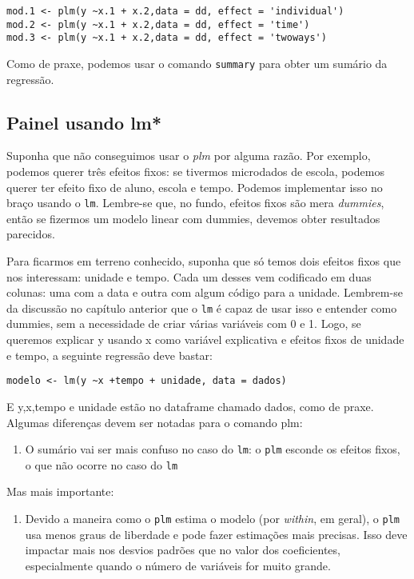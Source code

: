 \documentclass[
]{book}
\providecommand{\tightlist}{%
  \setlength{\itemsep}{0pt}\setlength{\parskip}{0pt}}
\begin{document}
\begin{verbatim}
mod.1 <- plm(y ~x.1 + x.2,data = dd, effect = 'individual')
mod.2 <- plm(y ~x.1 + x.2,data = dd, effect = 'time')
mod.3 <- plm(y ~x.1 + x.2,data = dd, effect = 'twoways')
\end{verbatim}

Como de praxe, podemos usar o comando \texttt{summary} para obter um sumário da regressão.

\hypertarget{painel-usando-lm}{%
\subsection{Painel usando lm*}\label{painel-usando-lm}}

Suponha que não conseguimos usar o \emph{plm} por alguma razão. Por exemplo, podemos querer três efeitos fixos: se tivermos microdados de escola, podemos querer ter efeito fixo de aluno, escola e tempo. Podemos implementar isso no braço usando o \texttt{lm}. Lembre-se que, no fundo, efeitos fixos são mera \emph{dummies}, então se fizermos um modelo linear com dummies, devemos obter resultados parecidos.

Para ficarmos em terreno conhecido, suponha que só temos dois efeitos fixos que nos interessam: unidade e tempo. Cada um desses vem codificado em duas colunas: uma com a data e outra com algum código para a unidade. Lembrem-se da discussão no capítulo anterior que o \texttt{lm} é capaz de usar isso e entender como dummies, sem a necessidade de criar várias variáveis com 0 e 1. Logo, se queremos explicar y usando x como variável explicativa e efeitos fixos de unidade e tempo, a seguinte regressão deve bastar:

\begin{verbatim}
modelo <- lm(y ~x +tempo + unidade, data = dados)
\end{verbatim}

E y,x,tempo e unidade estão no dataframe chamado dados, como de praxe. Algumas diferenças devem ser notadas para o comando plm:

\begin{enumerate}
\def\labelenumi{(\arabic{enumi})}
\tightlist
\item
  O sumário vai ser mais confuso no caso do \texttt{lm}: o \texttt{plm} esconde os efeitos fixos, o que não ocorre no caso do \texttt{lm}
\end{enumerate}

Mas mais importante:

\begin{enumerate}
\def\labelenumi{(\arabic{enumi})}
\setcounter{enumi}{1}
\tightlist
\item
  Devido a maneira como o \texttt{plm} estima o modelo (por \emph{within}, em geral), o \texttt{plm} usa menos graus de liberdade e pode fazer estimações mais precisas. Isso deve impactar mais nos desvios padrões que no valor dos coeficientes, especialmente quando o número de variáveis for muito grande.
\end{enumerate}
\end{document}
